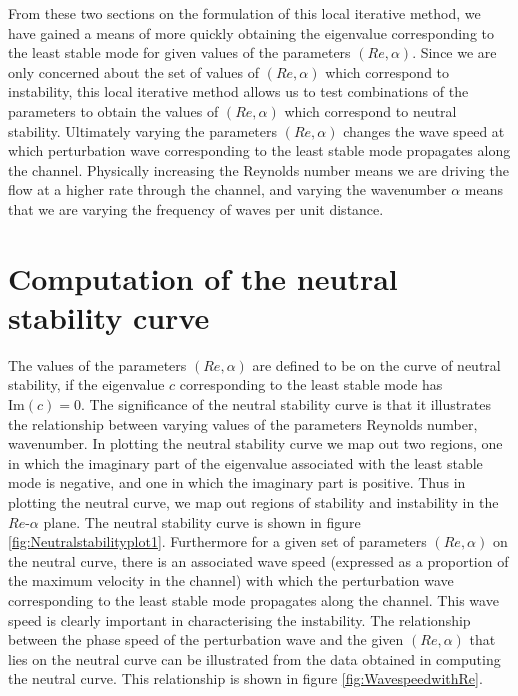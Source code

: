 \documentclass[a4paper, 12pt, twoside, openright]{article}
\numberwithin{equation}{section}
\begin{document}
% 
From these two sections on the formulation of this local iterative method, we have gained a means of more quickly obtaining the eigenvalue corresponding to the least stable mode for given values of the parameters $(Re,\alpha)$. Since we are only concerned about the set of values of $(Re,\alpha)$ which correspond to instability, this local iterative method allows us to test combinations of the parameters to obtain the values of $(Re,\alpha)$ which correspond to neutral stability. Ultimately varying the parameters $(Re,\alpha)$ changes the wave speed at which perturbation wave corresponding to the least stable mode propagates along the channel. Physically increasing the Reynolds number means we are driving the flow at a higher rate through the channel, and varying the wavenumber $\alpha$ means that we are varying the frequency of waves per unit distance. 

% 
%
%
%
\newpage
\section{Computation of the neutral stability curve}

The values of the parameters $(Re,\alpha)$ are defined to be on the curve of neutral stability, if the eigenvalue $c$ corresponding to the least stable mode has $\mathrm{Im}(c)=0$. The significance of the neutral stability curve is that it illustrates the relationship between varying values of the parameters Reynolds number, wavenumber. In plotting the neutral stability curve we map out two regions, one in which the imaginary part of the eigenvalue associated with the least stable mode is negative, and one in which the imaginary part is positive. Thus in plotting the neutral curve, we map out regions of stability and instability in the $Re$-$\alpha$ plane. The neutral stability curve is shown in figure \ref{fig:Neutralstabilityplot1}. Furthermore for a given set of parameters $(Re,\alpha)$ on the neutral curve, there is an associated wave speed (expressed as a proportion of the maximum velocity in the channel) with which the perturbation wave corresponding to the least stable mode propagates along the channel. This wave speed is clearly important in characterising the instability. The relationship between the phase speed of the perturbation wave and the given $(Re,\alpha)$ that lies on the neutral curve can be illustrated from the data obtained in computing the neutral curve. This relationship is shown in figure \ref{fig:WavespeedwithRe}. %
\end{document}
